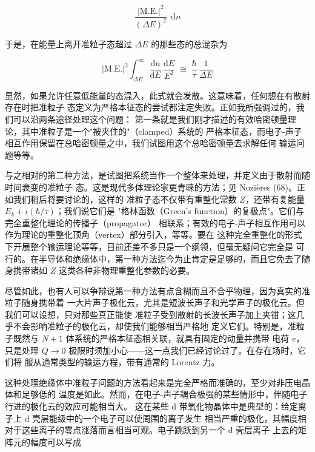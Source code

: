\begin{equation*}
\frac{\bigl|\text{M.E.}\bigr|^{2}}{(\Delta E)^{2}}\;\,\mathrm{d}n
\end{equation*}

于是，在能量上离开准粒子态超过 $\Delta E$ 的那些态的总混杂为

\begin{equation*}
\bigl|\text{M.E.}\bigr|^{2} \int_{\Delta E}^{\infty} \frac{\mathrm{d}n}{\mathrm{d}E}\,\frac{\mathrm{d}E}{E^{2}} \;\cong\; \frac{\hbar}{\tau}\,\frac{1}{\Delta E}
\end{equation*}

显然，如果允许任意低能量的态混入，此式就会发散。这意味着，任何想在有散射存在时把准粒子
态定义为严格本征态的尝试都注定失败。正如我所强调过的，我们可以沿两条途径处理这个问题：
第一条就是我们刚才描述的有效哈密顿量理论，其中准粒子是一个"被夹住的"（clamped）系统的
严格本征态，而电子-声子相互作用保留在总哈密顿量之中，我们试图用这个总哈密顿量去求解任何
输运问题等等。

与之相对的第二种方法，是试图把系统当作一个整体来处理，并定义由于散射而随时间衰变的准粒子
态。这是现代多体理论家更青睐的方法；见 Nozières (68)。正如我们稍后将要讨论的，这样的
准粒子态不仅带有重整化常数 $Z$，还带有复能量 $E_{k} + i(\hbar/\tau)$；我们说它们是
"格林函数（Green's function）的复极点"。它们与完全重整化理论的传播子（propagator）
相联系；有效的电子-声子相互作用可以作为理论的重整化顶角（vertex）部分引入，等等。要在
这种完全重整化的形式下开展整个输运理论等等，目前还差不多只是一个纲领，但毫无疑问它完全是
可行的。在半导体和绝缘体中，第一种方法迄今为止肯定是足够的，而且它免去了随身携带诸如 $Z$
这类各种非物理重整化参数的必要。

尽管如此，也有人可以争辩说第一种方法有点含糊而且不合乎物理，因为真实的准粒子随身携带着
一大片声子极化云，尤其是短波长声子和光学声子的极化云。但我们可以设想，只对那些真正能使
准粒子受到散射的长波长声子加上夹钳；这几乎不会影响准粒子的极化云，却使我们能够相当严格地
定义它们。特别是，准粒子既然与 $N+1$ 体系统的严格本征态相关联，就具有固定的动量并携带
电荷 $e$，只是处理 $Q\to 0$ 极限时须加小心——这一点我们已经讨论过了。在存在场时，它们将
服从通常类型的输运方程，带有通常的 Lorentz 力。

这种处理绝缘体中准粒子问题的方法看起来是完全严格而准确的，至少对非压电晶体和足够低的
温度是如此。然而，在电子-声子耦合极强的某些情形中，伴随电子行进的极化云的效应可能相当大。
这在某些 d 带氧化物晶体中是典型的：给定离子上 d 壳层能级中的一个电子可以使周围的离子发生
相当严重的极化，其幅度相对于这些离子的零点涨落而言相当可观。电子跳跃到另一个 d 壳层离子
上去的矩阵元的幅度可以写成

